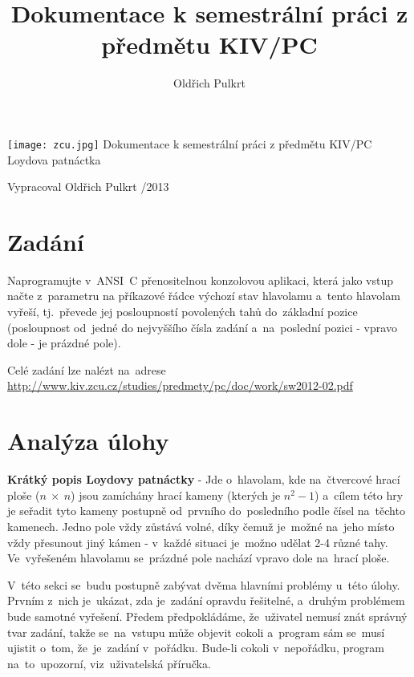 \documentclass[12pt,titlepage]{article}
\author{Oldřich Pulkrt}
\title{Dokumentace k semestrální práci z předmětu KIV/PC}
\begin{document}
\begin{center}
\thispagestyle{empty}
\texttt{[image: zcu.jpg]}
\newline
\newline
\newline
\newline
\newline
\newline
\newline
\LARGE{Dokumentace k semestrální práci z předmětu KIV/PC}
\newline
Loydova patnáctka
\end{center}

\begin{flushleft}
\Large
\vspace{4cm}
Vypracoval Oldřich Pulkrt
/2013
\end{flushleft}

\newpage
\tableofcontents
\newpage
\section{Zadání}
\par
Naprogramujte v~ANSI~C přenositelnou konzolovou aplikaci, která jako vstup načte z~parametru na příkazové řádce výchozí stav hlavolamu  a~tento hlavolam vyřeší, tj.~převede jej posloupností povolených tahů do~základní pozice (posloupnost od~jedné do nejvyššího čísla zadání a~na~poslední pozici - vpravo dole - je prázdné pole).
\newline
\par
Celé zadání lze nalézt na~adrese \url{http://www.kiv.zcu.cz/studies/predmety/pc/doc/work/sw2012-02.pdf}

\section{Analýza úlohy}
\textbf{Krátký popis Loydovy patnáctky} - Jde o~hlavolam, kde na~čtvercové hrací ploše ($n~\times~n$) jsou zamíchány hrací kameny (kterých je $n^2 - 1$) a~cílem této hry je seřadit tyto kameny postupně od~prvního do~posledního podle čísel na~těchto kamenech. Jedno pole vždy zůstává volné, díky čemuž je~možné na~jeho místo vždy přesunout jiný kámen - v~každé situaci je~možno udělat 2-4 různé tahy. Ve~vyřešeném hlavolamu se~prázdné pole nachází vpravo dole na~hrací ploše.
\newline
\par
V~této sekci se~budu postupně zabývat dvěma hlavními problémy u~této úlohy. Prvním z~nich je~ukázat, zda je~zadání opravdu řešitelné, a~druhým problémem bude samotné vyřešení. Předem předpokládáme, že~uživatel nemusí znát správný tvar zadání, takže se~na~vstupu může objevit cokoli a~program sám se~musí ujistit o~tom, že~je~zadání v~pořádku. Bude-li cokoli v~nepořádku, program na~to~upozorní, viz~uživatelská příručka.
\end{document}
